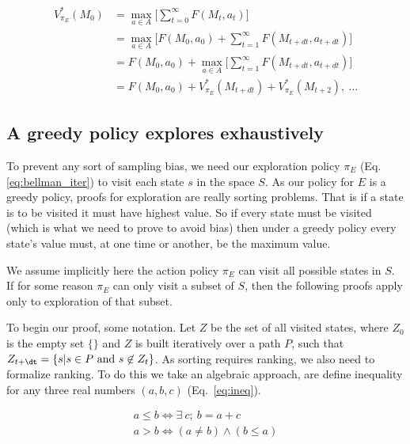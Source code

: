 \begin{equation}\label{eq:bellman_seq} 
	\begin{split}
		V^*_{\pi_E}(M_0) &= \max_{a \in A} \Big [\sum_{t=0}^{\infty} F(M_t, a_t)\Big ]\\
		&= \max_{a \in A} \Big [F(M_0, a_0) + \sum^{\infty}_{t=1} F(M_{t+dt}, a_{t+dt})\Big ]\\
		&= F(M_0, a_0) + \max_{a \in A} \Big [\sum_{t=1}^{\infty} F(M_{t+dt}, a_{t+dt}) \Big ]\\
		&= F(M_0, a_0) + V^*_{\pi_E}(M_{t+dt}) + V^*_{\pi_E}(M_{t+2}),\ \ldots 
	\end{split}
\end{equation}

\subsection*{A greedy policy explores exhaustively} To prevent any sort of sampling bias, we need our exploration policy $\pi_E$ (Eq.\ref{eq:bellman_iter}) to visit each state $s$ in the space $S$. As our policy for $E$ is a greedy policy, proofs for exploration are really sorting problems. That is if a state is to be visited it must have highest value. So if every state must be visited (which is what we need to prove to avoid bias) then under a greedy policy every state's value must, at one time or another, be the maximum value. 

We assume implicitly here the action policy $\pi_E$ can visit all possible states in $S$. If for some reason $\pi_E$ can only visit a subset of $S$, then the following proofs apply only to exploration of that subset.

To begin our proof, some notation. Let $Z$ be the set of all visited states, where $Z_0$ is the empty set $\{\}$ and $Z$ is built iteratively over a path $P$, such that $Z_{t+\dt} = \{s | s \in P\ \text{and}\ s \not\in Z_t\}$. As sorting requires ranking, we also need to formalize ranking. To do this we take an algebraic approach, are define inequality for any three real numbers $(a,b,c)$ (Eq.~\ref{eq:ineq}). 

\begin{align}\label{eq:ineq} 
	a \leq b \Leftrightarrow \exists \ c;\ b = a + c \\
	a > b \Leftrightarrow (a \neq b) \wedge (b \leq a) 
\end{align}


